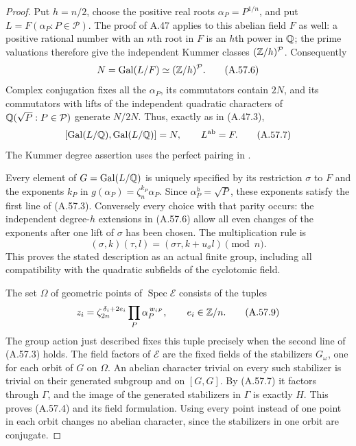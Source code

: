 \begin{proof}
Put $h=n/2$, choose the positive real roots
$\alpha_P=P^{1/n}$, and put $L=F(\alpha_P:P\in\mathcal P)$.
The proof of A.47 applies to this abelian field $F$
as well: a positive rational number with an $n$th
root in $F$ is an $h$th power in $\mathbb Q$; the prime
valuations therefore give the independent Kummer
classes $(\mathbb Z/h)^{\mathcal P}$. Consequently
\[
 N=\operatorname{Gal}(L/F)\simeq(\mathbb Z/h)^{\mathcal P}.
 \tag{A.57.6}
\]
Complex conjugation fixes all the $\alpha_P$,
its commutators contain $2N$, and its commutators
with lifts of the independent quadratic characters
of $\mathbb Q(\sqrt P:P\in\mathcal P)$ generate $N/2N$.
Thus, exactly as in (A.47.3),
\[
       [\operatorname{Gal}(L/\mathbb Q),\operatorname{Gal}(L/\mathbb Q)]
                      =N,\qquad L^{\mathrm{ab}}=F.
 \tag{A.57.7}
\]
The Kummer degree assertion uses the perfect pairing
in \cite[Theorem 5.30 and Remark 5.32]{AgentMilneFT}.

Every element of $G=\operatorname{Gal}(L/\mathbb Q)$ is
uniquely specified by its restriction $\sigma$ to
$F$ and the exponents $k_P$ in
$g(\alpha_P)=\zeta_n^{k_P}\alpha_P$.
Since $\alpha_P^h=\sqrt P$, these exponents satisfy
the first line of (A.57.3). Conversely every choice
with that parity occurs: the independent degree-$h$
extensions in (A.57.6) allow all even changes of
the exponents after one lift of $\sigma$ has been
chosen. The multiplication rule is
\[
        (\sigma,k)(\tau,l)
               =(\sigma\tau,k+u_\sigma l)\pmod n.
 \tag{A.57.8}
\]
This proves the stated description as an actual
finite group, including all compatibility with
the quadratic subfields of the cyclotomic field.

The set $\Omega$ of geometric points of
$\operatorname{Spec}\mathcal E$ consists of the tuples
\[
       z_i=\zeta_{2n}^{\,\delta_i+2e_i}
                      \prod_P\alpha_P^{\,w_{iP}},
                    \qquad e_i\in\mathbb Z/n.
 \tag{A.57.9}
\]
The group action just described fixes this tuple
precisely when the second line of (A.57.3) holds.
The field factors of $\mathcal E$ are the fixed fields
of the stabilizers $G_\omega$, one for each orbit
of $G$ on $\Omega$. An abelian character trivial
on every such stabilizer is trivial on their
generated subgroup and on $[G,G]$. By (A.57.7)
it factors through $\Gamma$, and the image of
the generated stabilizers in $\Gamma$ is exactly
$H$. This proves (A.57.4) and its field formulation.
Using every point instead of one point in each
orbit changes no abelian character, since the
stabilizers in one orbit are conjugate.


\end{proof}
